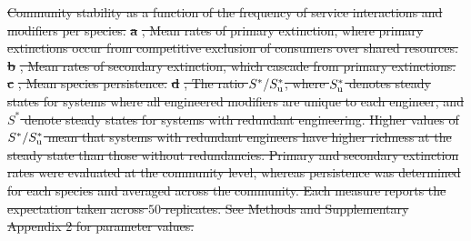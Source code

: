 \documentclass[twocolumn,preprintnumbers,amsmath,amssymb,superscriptaddress,linenumbers]{revtex4-1}
\providecommand{\DIFdel}[1]{{\protect\color{red}\sout{#1}}}                      %
\providecommand{\DIFdelbegin}{} %
\providecommand{\DIFdelFL}[1]{\DIFdel{#1}} %
\newcommand{\DIFscaledelfig}{0.5}
\newlength{\DIFdelgraphicswidth} %
\newlength{\DIFdelgraphicsheight} %
\newcommand{\DIFdelincludegraphics}[2][]{%
\sbox{\DIFdelgraphicsbox}{\DIFOincludegraphics[#1]{#2}}%
\settoboxwidth{\DIFdelgraphicswidth}{\DIFdelgraphicsbox} %
\settoboxtotalheight{\DIFdelgraphicsheight}{\DIFdelgraphicsbox} %
\scalebox{\DIFscaledelfig}{%
\parbox[b]{\DIFdelgraphicswidth}{\usebox{\DIFdelgraphicsbox}\\[-\baselineskip] \rule{\DIFdelgraphicswidth}{0em}}\llap{\resizebox{\DIFdelgraphicswidth}{\DIFdelgraphicsheight}{%
\setlength{\unitlength}{\DIFdelgraphicswidth}%
\begin{picture}(1,1)%
\thicklines\linethickness{2pt} %
{\color[rgb]{1,0,0}\put(0,0){\framebox(1,1){}}}%
{\color[rgb]{1,0,0}\put(0,0){\line( 1,1){1}}}%
{\color[rgb]{1,0,0}\put(0,1){\line(1,-1){1}}}%
\end{picture}%
}\hspace*{3pt}}} %
} %
\DeclareRobustCommand{\DIFdelbegin}{\DIFOdelbegin \let\includegraphics\DIFdelincludegraphics} %
\begin{document}





\DIFdelbegin %
{%
\DIFdelFL{Community stability as a function of the frequency of service interactions and modifiers per species.
}\textbf{\DIFdelFL{a}}%
\DIFdelFL{, Mean rates of primary extinction, where primary extinctions occur from competitive exclusion of consumers over shared resources.
}\textbf{\DIFdelFL{b}}%
\DIFdelFL{, Mean rates of secondary extinction, which cascade from primary extinctions.
}\textbf{\DIFdelFL{c}}%
\DIFdelFL{, Mean species persistence.
}\textbf{\DIFdelFL{d}}%
\DIFdelFL{, The ratio $S^*/S^*_{\rm u}$, where $S^*_{\rm u}$ denotes steady states for systems where all engineered modifiers are unique to each engineer, and $S^*$ denote steady states for systems with redundant engineering. Higher values of $S^*/S^*_{\rm u}$ mean that systems with redundant engineers have higher richness at the steady state than those without redundancies.
Primary and secondary extinction rates were evaluated at the community level, whereas persistence was determined for each species and averaged across the community.
Each measure reports the expectation taken across $50$ replicates.
See Methods and Supplementary Appendix 2 for parameter values.
}%
}
\end{document}
